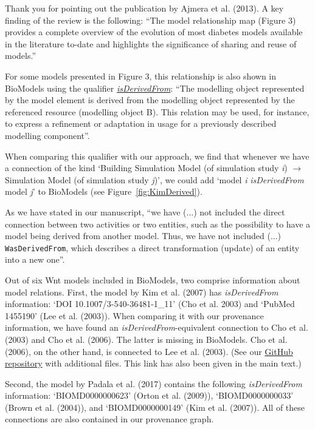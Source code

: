\documentclass{article}
\begin{document}
Thank you for pointing out the publication by Ajmera et al. (2013).
A key finding of the review is the following: \enquote{The model relationship map (Figure 3) provides a complete overview of the evolution of most diabetes models available in the literature to-date and highlights the significance of sharing and reuse of models.}

For some models presented in Figure 3, this relationship is also shown in BioModels using the qualifier \href{http://biomodels.net/model-qualifiers/isDerivedFrom}{\textit{isDerivedFrom}}: \enquote{The modelling object represented by the model element is derived from the modelling object represented by the referenced resource (modelling object B).
This relation may be used, for instance, to express a refinement or adaptation in usage for a previously described modelling component}.

When comparing this qualifier with our approach, we find that whenever we have a connection of the kind `Building Simulation Model (of simulation study \textit{i}) $\longrightarrow$ Simulation Model (of simulation study \textit{j})', we could add `model \textit{i} \textit{isDerivedFrom} model \textit{j}' to BioModels (see Figure~\ref{fig:KimDerived}).

As we have stated in our manuscript, \enquote{we have (...) not included the direct connection between two activities or two entities, such as the possibility to have a model being derived from another model. Thus, we have not included (...)  \texttt{WasDerivedFrom}, which describes a direct transformation (update) of an entity into a new one}.

Out of six Wnt models included in BioModels, two comprise information about model relations.
First, the model by Kim et al. (2007) has \textit{isDerivedFrom} information: `DOI 10.1007/3-540-36481-1\_11' (Cho et al. 2003) and `PubMed 1455190' (Lee et al. (2003)).
When comparing it with our provenance information, we have found an \textit{isDerivedFrom}-equivalent connection to Cho et al. (2003) and Cho et al. (2006).
The latter is missing in BioModels.
Cho et al. (2006), on the other hand, is connected to Lee et al. (2003).
(See our \href{https://github.com/SFB-ELAINE/SI_Provenance_Wnt_Family/tree/main/ProvenanceInformation}{GitHub repository} with additional files.
This link has also been given in the main text.)

Second, the model by Padala et al. (2017) contains the following \textit{isDerivedFrom} information: `BIOMD0000000623' (Orton et al. (2009)), `BIOMD0000000033' (Brown et al. (2004)), and `BIOMD0000000149' (Kim et al. (2007)).
All of these connections are also contained in our provenance graph.
\end{document}
